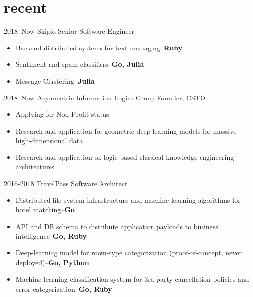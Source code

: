 \documentclass[]{friggeri-cv}
\begin{document}
\section{recent}
\begin{entrylist}
  \entry
    {2018--Now}
    {Skipio}
    {Senior Software Engineer}
    {
     	\begin{itemize}
     		\item Backend distributed systems for text messaging--{\bf Ruby}
     		\item Sentiment and spam classifiers--{\bf Go, Julia}
     		\item Message Clustering--{\bf Julia}\\
     	\end{itemize}
     }
  \entry
    {2018--Now}
    {Asymmetric Information Logics Group}
    {Founder, CSTO}
       {
     	\begin{itemize}
		\item Applying for Non-Profit status
     		\item Research and application for geometric deep learning models for massive high-dimensional data 
     		\item Research and application on logic-based classical knowledge engineering architectures\\
     	\end{itemize}
     }
  \entry
    {2016-2018}
    {TravelPass}
    {Software Architect}
    {
    	\begin{itemize}
		\item Distributed file-system infrastructure and machine learning algorithms for hotel matching--{\bf Go}
		\item API and DB schema to distribute application payloads to business intelligence--{\bf Go, Ruby}
		\item Deep-learning model for room-type categorization (proof-of-concept, never deployed)--{\bf Go, Python}
		\item Machine learning classification system for 3rd party cancellation policies and error categorization--{\bf Go, Ruby}\\
	\end{itemize}
    }
\end{entrylist}
\end{document}
